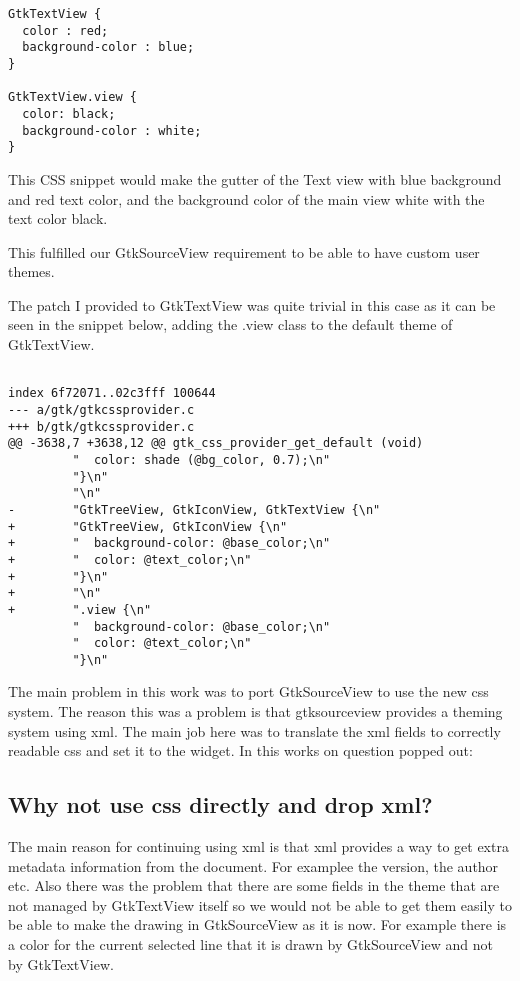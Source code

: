 \begin{lstlisting}[style=plain]
GtkTextView {
  color : red;
  background-color : blue;
}

GtkTextView.view {
  color: black;
  background-color : white;
}
\end{lstlisting}

This CSS snippet would make the gutter of the Text view with blue background and red text color, and the background color of the 
main view white with the text color black.

This fulfilled our GtkSourceView requirement to be able to have custom user themes.

The patch I provided to GtkTextView was quite trivial in this case as it can be seen in the snippet below, adding the .view class to the default theme of GtkTextView.

\begin{lstlisting}[style=plain]

index 6f72071..02c3fff 100644
--- a/gtk/gtkcssprovider.c
+++ b/gtk/gtkcssprovider.c
@@ -3638,7 +3638,12 @@ gtk_css_provider_get_default (void)
         "  color: shade (@bg_color, 0.7);\n"
         "}\n"
         "\n"
-        "GtkTreeView, GtkIconView, GtkTextView {\n"
+        "GtkTreeView, GtkIconView {\n"
+        "  background-color: @base_color;\n"
+        "  color: @text_color;\n"
+        "}\n"
+        "\n"
+        ".view {\n"
         "  background-color: @base_color;\n"
         "  color: @text_color;\n"
         "}\n"

\end{lstlisting}

The main problem in this work was to port GtkSourceView to use the new css system. The reason this was a problem is that gtksourceview provides a theming system using xml. The main job here was to translate the xml fields to correctly readable css and set it to the widget. In this works on question popped out:

\subsection*{Why not use css directly and drop xml?}

The main reason for continuing using xml is that xml provides a way to get extra metadata information from the document. For examplee the version, the author etc. Also there was the problem that there are some fields in the theme that are not managed by GtkTextView itself so we would not be able to get them easily to be able to make the drawing in GtkSourceView as it is now. For example there is a color for the current selected line that it is drawn by GtkSourceView and not by GtkTextView.

